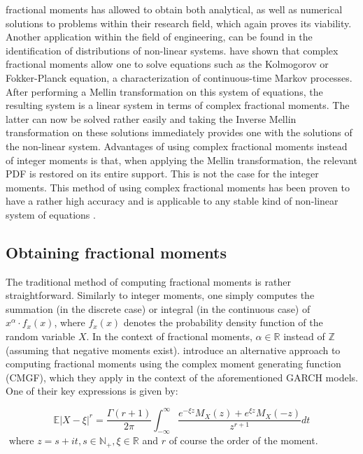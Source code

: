 fractional moments has allowed \cite{wang2025} to obtain both analytical, as well as numerical solutions to problems within their research field, which again proves its viability. Another application within the field of engineering, can be found in the identification of distributions of non-linear systems. \cite{dimatteo2014} have shown that complex fractional moments allow one to solve equations such as the Kolmogorov or Fokker-Planck equation, a characterization of continuous-time Markov processes. After performing a Mellin transformation on this system of equations, the resulting system is a linear system in terms of complex fractional moments. The latter can now be solved rather easily and taking the Inverse Mellin transformation on these solutions immediately provides one with the solutions of the non-linear system. Advantages of using complex fractional moments instead of integer moments is that, when applying the Mellin transformation, the relevant PDF is restored on its entire support. This is not the case for the integer moments. This method of using complex fractional moments has been proven to have a rather high accuracy and is applicable to any stable kind of non-linear system of equations \cite{dimatteo2014}.

\subsection{Obtaining fractional moments}
The traditional method of computing fractional moments is rather straightforward. Similarly to integer moments, one simply computes the summation (in the discrete case) or integral (in the continuous case) of \(x^\alpha \cdot f_x(x)\), where \(f_x(x)\) denotes the probability density function of the random variable \(X\). In the context of fractional moments, \(\alpha \in \mathbb{R}\) instead of \(\mathbb{Z}\) (assuming that negative moments exist). \cite{hansen2024} introduce an alternative approach to computing fractional moments using the complex moment generating function (CMGF), which they apply in the context of the aforementioned GARCH models. One of their key expressions is given by:

\[\mathbb{E}\left| X - \xi \right|^r = \frac{\Gamma(r+1)}{2\pi} \int_{-\infty}^{\infty} \frac{e^{-\xi z} M_X(z) + e^{\xi z} M_X(-z)}{z^{r+1}} dt\] \(\text{ where } z = s + it, s \in \mathbb{N_+}, \xi \in \mathbb{R} \) and \(r\) of course the order of the moment.

